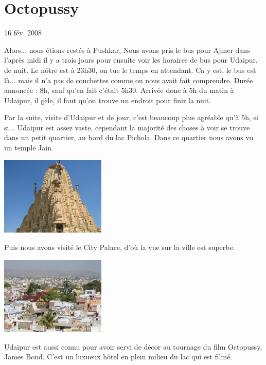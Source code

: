 \section{Octopussy}

16 fév. 2008

\begin{multicols}{2}

Alors... nous étions restés à Pushkar, Nous avons pris le bus pour Ajmer dans l'après midi il y a trois jours pour ensuite voir les horaires de bus pour Udaipur, de nuit. Le nôtre est à 23h30, on tue le temps en attendant. Ca y est, le bus est là... mais il n'a pas de couchettes comme on nous avait fait comprendre. Durée annoncée : 8h, sauf qu'en fait c'était 5h30. Arrivée donc à 5h du matin à Udaipur, il gèle, il faut qu'on trouve un endroit pour finir la nuit.

Par la suite, visite d'Udaipur et de jour, c'est beaucoup plus agréable qu'à 5h, si si... Udaipur est assez vaste, cependant la majorité des choses à voir se trouve dans un petit quartier, au bord du lac Pichola. Dans ce quartier nous avons vu un temple Jain.

\smallbreak
\hspace*{-0.65cm}
\includegraphics[width=5cm]{articles/Octopussy/jain.jpg}
\smallbreak

Puis nous avons visité le City Palace, d'où la vue sur la ville est superbe.

\smallbreak
\hspace*{-0.65cm}
\includegraphics[width=5cm]{articles/Octopussy/zoomville.jpg}
\smallbreak

Udaipur est aussi connu pour avoir servi de décor au tournage du film Octopussy, James Bond. C'est un luxueux hôtel en plein milieu du lac qui est filmé.


\end{multicols}
